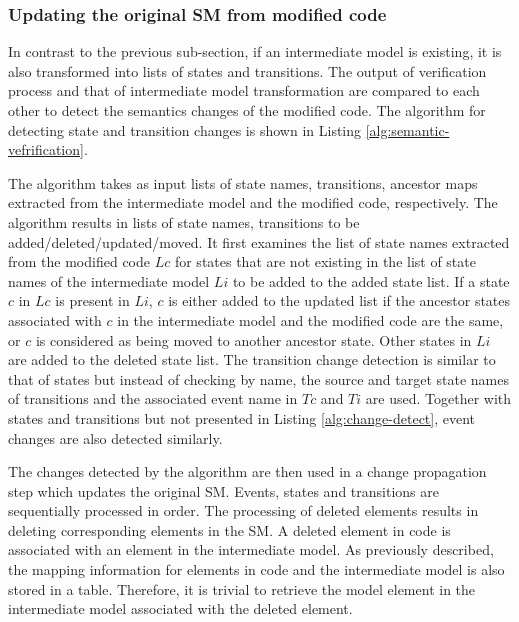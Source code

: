 \subsubsection{Updating the original SM from modified code}
In contrast to the previous sub-section, if an intermediate model is existing, it is also transformed into lists of states and transitions. The output of verification process and that of intermediate model transformation are compared to each other to detect the semantics changes of the modified code. The algorithm for detecting state and transition changes is shown in Listing \ref{alg:semantic-vefrification}.

The algorithm takes as input lists of state names, transitions, ancestor maps extracted from the intermediate model and the modified code, respectively. The algorithm results in lists of state names, transitions to be added/deleted/updated/moved. It first examines the list of state names extracted from the modified code $Lc$ for states that are not existing in the list of state names of the intermediate model $Li$ to be added to the added state list. If a state $c$ in $Lc$ is present in $Li$, $c$ is either added to the updated list if the ancestor states associated with $c$ in the intermediate model and the modified code are the same, or $c$ is considered as being moved to another ancestor state. Other states in $Li$ are added to the deleted state list. The transition change detection is similar to that of states but instead of checking by name, the source and target state names of transitions and the associated event name in $Tc$ and $Ti$ are used. Together with states and transitions but not presented in Listing \ref{alg:change-detect}, event changes are also detected similarly.

The changes detected by the algorithm are then used in a change propagation step which updates the original SM. Events, states and transitions are sequentially processed in order. The processing of deleted elements results in deleting corresponding elements in the SM. A deleted element in code is associated with an element in the intermediate model. As previously described, the mapping information for elements in code and the intermediate model is also stored in a table. Therefore, it is trivial to retrieve the model element in the intermediate model associated with the deleted element.

